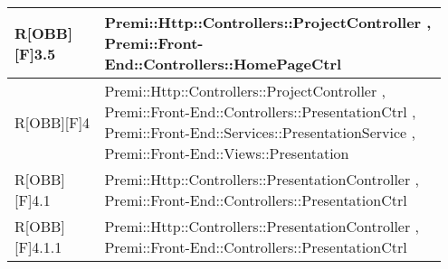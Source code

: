 \begin{table}[h]
\begin{center}
\begin{tabular}{|p{0.2\linewidth}|p{0.75\linewidth}|}
		\midrule
			R[OBB][F]3.5 & Premi::Http::Controllers::ProjectController , Premi::Front-End::Controllers::HomePageCtrl\\
		\midrule
			R[OBB][F]4 & Premi::Http::Controllers::ProjectController , Premi::Front-End::Controllers::PresentationCtrl , Premi::Front-End::Services::PresentationService , Premi::Front-End::Views::Presentation\\
		\midrule
			R[OBB][F]4.1 & Premi::Http::Controllers::PresentationController , Premi::Front-End::Controllers::PresentationCtrl\\
		\midrule
			R[OBB][F]4.1.1 & Premi::Http::Controllers::PresentationController , Premi::Front-End::Controllers::PresentationCtrl\\

\bottomrule
\end{tabular}
\end{center}
\end{table}

